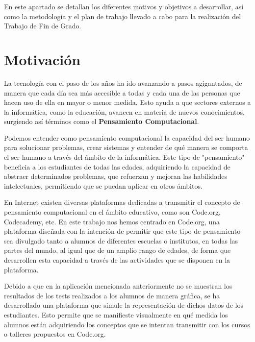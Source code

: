 
En este apartado se detallan los diferentes motivos y objetivos a desarrollar, así como la metodología y el plan de trabajo llevado a cabo para la realización del Trabajo de Fin de Grado.

\section{Motivación}
\label{1:sec:1}

La tecnología con el paso de los años ha ido avanzando a pasos agigantados, de manera que cada día sea más accesible a todas y cada una de las personas que hacen uso de ella en mayor o menor medida. Esto ayuda a que sectores externos a la informática, como la educación, avancen en materia de nuevos conocimientos,
surgiendo así términos como el \textbf{Pensamiento Computacional}.

Podemos entender como pensamiento computacional la capacidad del ser humano para solucionar problemas, crear sistemas y entender de qué manera se comporta el ser humano a través del ámbito de la informática. Este tipo de "pensamiento" beneficia a los estudiantes de todas las edades, adquiriendo la capacidad de abstraer determinados
problemas, que refuerzan y mejoran las habilidades intelectuales, permitiendo que se puedan aplicar en otros ámbitos.

En Internet existen diversas plataformas dedicadas a transmitir el concepto de pensamiento computacional en el ámbito educativo, como son Code.org\cite{Code.org}, Codecademy\cite{Codecademy}, etc. En este trabajo nos hemos centrado en Code.org, una plataforma diseñada con la intención de permitir que este tipo de pensamiento sea divulgado tanto a alumnos de diferentes
escuelas o institutos, en todas las partes del mundo, al igual que de un amplio rango de edades, de forma que desarrollen esta capacidad a través de las actividades que se disponen en la plataforma.

Debido a que en la aplicación mencionada anteriormente no se muestran los resultados de los tests realizados a los alumnos de manera gráfica, se ha desarrollado una plataforma que simule la representación de dichos datos de los estudiantes. Esto permite que se manifieste visualmente en qué medida los alumnos están adquiriendo los conceptos
que se intentan transmitir con los cursos o talleres propuestos en Code.org. 

